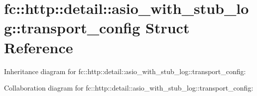 \hypertarget{structfc_1_1http_1_1detail_1_1asio__with__stub__log_1_1transport__config}{}\section{fc\+:\+:http\+:\+:detail\+:\+:asio\+\_\+with\+\_\+stub\+\_\+log\+:\+:transport\+\_\+config Struct Reference}
\label{structfc_1_1http_1_1detail_1_1asio__with__stub__log_1_1transport__config}


Inheritance diagram for fc\+:\+:http\+:\+:detail\+:\+:asio\+\_\+with\+\_\+stub\+\_\+log\+:\+:transport\+\_\+config\+:


Collaboration diagram for fc\+:\+:http\+:\+:detail\+:\+:asio\+\_\+with\+\_\+stub\+\_\+log\+:\+:transport\+\_\+config\+:
